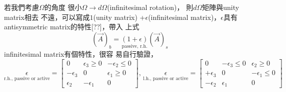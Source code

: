 \documentclass[12pt,a4paper]{article}
\begin{document}
若我們考慮$\Omega $的角度%
很小$\Omega \rightarrow d\Omega $(infinitesimal rotation)，%
則$d\Omega $矩陣與unity matrix相去%
不遠，可以寫成$1$(unity matrix) +$%
\epsilon $(infinitesimal matrix)，$\epsilon $具有%
antisymmetric matrix的特性[??]，帶入%
上式%
\begin{equation*}
\left( \vec{A}\right) _{b}=\underset{\text{passive, r.h.}}{\left( 1+\epsilon
\right) }\left( \vec{A}\right) _{s}
\end{equation*}%
infinitesimal matrix有個特性，很容%
易自行驗證，%
\begin{equation*}
\underset{\text{r.h., passive or active}}{\epsilon }=\left[ 
\begin{array}{ccc}
0 & \epsilon _{3}\geq 0 & -\epsilon _{2}\leq 0 \\ 
-\epsilon _{3} & 0 & \epsilon _{1}\geq 0 \\ 
\epsilon _{2} & -\epsilon _{1} & 0%
\end{array}%
\right] \text{, }\underset{\text{l.h., passive or active}}{\epsilon }=\left[ 
\begin{array}{ccc}
0 & -\epsilon _{3}\leq 0 & \epsilon _{2}\geq 0 \\ 
+\epsilon _{3} & 0 & -\epsilon _{1}\leq 0 \\ 
-\epsilon _{2} & \epsilon _{1} & 0%
\end{array}%
\right]
\end{equation*}
\end{document}
